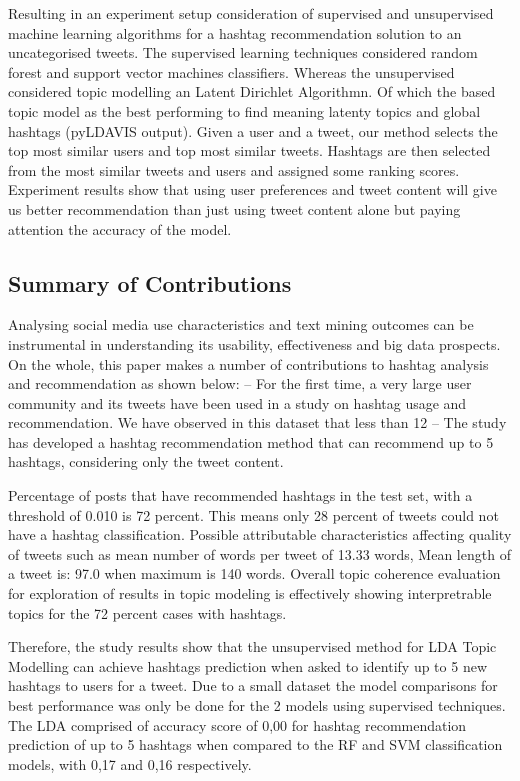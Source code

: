 Resulting in an experiment setup consideration of supervised and unsupervised machine learning algorithms for a hashtag recommendation solution to an uncategorised tweets. The supervised learning techniques considered random forest and support vector machines classifiers. Whereas the unsupervised considered topic modelling an Latent Dirichlet Algorithmn.  Of which the based topic model as the best performing to find meaning latenty topics and global hashtags (pyLDAVIS output).  Given a user and a tweet, our method selects the top most similar users and top most similar tweets. Hashtags are then selected from the most similar tweets and users and assigned some ranking scores. Experiment results show that using user preferences and tweet content will give us better recommendation than just using tweet content alone but paying attention the accuracy of the model.

\subsection{Summary of Contributions}

Analysing social media use characteristics and text mining outcomes can be instrumental in understanding its usability, effectiveness and big data prospects.
On the whole, this paper makes a number of contributions to hashtag analysis and recommendation as shown below:
– For the first time, a very large user community and its tweets have been used in a study on hashtag usage and recommendation. We have observed in this dataset that less than 12%
– The study has developed a hashtag recommendation method that can recommend up to 5 hashtags, considering only the tweet content. 

Percentage of posts that have recommended hashtags in the test set, with a threshold of 0.010 is 72 percent.  This means only 28 percent of tweets could not have a hashtag classification.  Possible attributable characteristics affecting quality of tweets such as mean number of words per tweet of 13.33 words, 
Mean length of a tweet is: 97.0 when maximum is 140 words.  Overall topic coherence evaluation for exploration of results in topic modeling is effectively showing interpretrable topics for the 72 percent cases with hashtags. 

Therefore, the study results show that the unsupervised method for LDA Topic Modelling can achieve hashtags prediction when asked to identify up to 5 new hashtags to users for a tweet.  Due to a small dataset the model comparisons for best performance was only be done for the 2 models using supervised techniques.  The LDA comprised of accuracy score of 0,00 for hashtag recommendation prediction of up to 5 hashtags when compared to the RF and SVM  classification models, with 0,17 and 0,16 respectively.  

